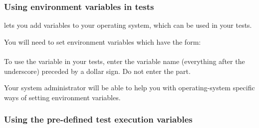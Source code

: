 \subsubsection{Using environment variables in tests}
\label{TasksSystemVariables}


\app{} lets you add variables to your operating system, which can be used in your tests. 

You will need to set environment variables which have the form:\\

\\


To use the variable in your tests, enter the variable name (everything after the underscore) preceded by a dollar sign. Do not enter the  part.


Your system administrator will be able to help you with operating-system specific ways of setting environment variables. 



\subsubsection{Using the \app{} pre-defined test execution variables}
\label{TasksPredefinedVariables}

